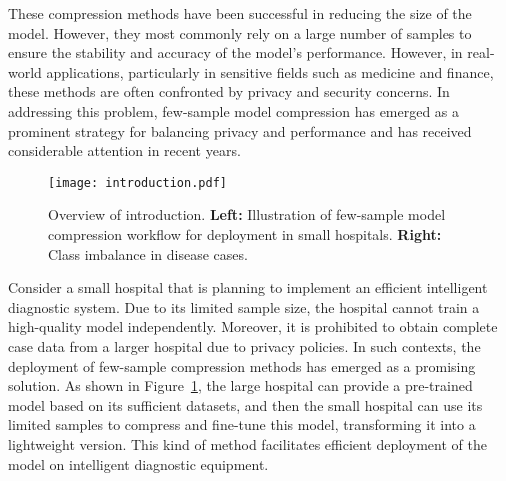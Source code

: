 \documentclass[twoside,11pt]{article}
\begin{document}
These compression methods have been successful in reducing the size of the model. However, they most commonly rely on a large number of samples to ensure the stability and accuracy of the model's performance. However, in real-world applications, particularly in sensitive fields such as medicine and finance, these methods are often confronted by privacy and security concerns. In addressing this problem, few-sample model compression has emerged as a prominent strategy for balancing privacy and performance and has received considerable attention in recent years. 

\begin{figure}[t]
\centering
\texttt{[image: introduction.pdf]}
\caption{Overview of introduction. \textbf{Left:} Illustration of few-sample model compression workflow for deployment in small hospitals. \textbf{Right:} Class imbalance in disease cases.}
\label{fig: introduction}
\end{figure}

Consider a small hospital that is planning to implement an efficient intelligent diagnostic system. Due to its limited sample size, the hospital cannot train a high-quality model independently. Moreover, it is prohibited to obtain complete case data from a larger hospital due to privacy policies. In such contexts, the deployment of few-sample compression methods has emerged as a promising solution. As shown in Figure~\ref{fig: introduction}, the large hospital can provide a pre-trained model based on its sufficient datasets, and then the small hospital can use its limited samples to compress and fine-tune this model, transforming it into a lightweight version. This kind of method facilitates efficient deployment of the model on intelligent diagnostic equipment.
\end{document}
